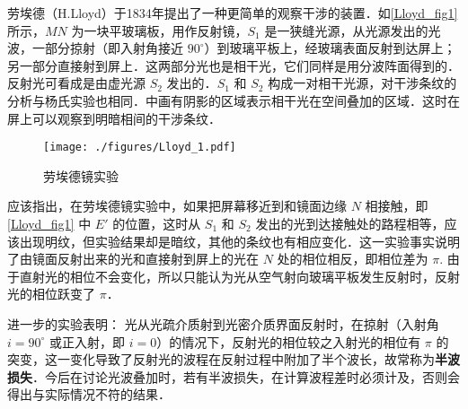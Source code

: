 

劳埃德（H.Lloyd）于1834年提出了一种更简单的观察干涉的装置．如\autoref{Lloyd_fig1} 所示，$MN $ 为一块平玻璃板，用作反射镜，$S_1$ 是一狭缝光源，从光源发出的光波，一部分掠射（即入射角接近 $90^\circ$）到玻璃平板上，经玻璃表面反射到达屏上；另一部分直接射到屏上．这两部分光也是相干光，它们同样是用分波阵面得到的．反射光可看成是由虚光源 $S_2 $ 发出的．$S_1$ 和 $S_2 $ 构成一对相干光源，对干涉条纹的分析与杨氏实验也相同．中画有阴影的区域表示相干光在空间叠加的区域．这时在屏上可以观察到明暗相间的干涉条纹．
\begin{figure}[ht]
\centering
\texttt{[image: ./figures/Lloyd\_1.pdf]}
\caption{劳埃德镜实验} \label{Lloyd_fig1}
\end{figure}
应该指出，在劳埃德镜实验中，如果把屏幕移近到和镜面边缘 $N $ 相接触，即\autoref{Lloyd_fig1} 中 $E' $ 的位置，这时从 $S_1$ 和 $S_2$ 发出的光到达接触处的路程相等，应该出现明纹，但实验结果却是暗纹，其他的条纹也有相应变化．这一实验事实说明了由镜面反射出来的光和直接射到屏上的光在 $N $ 处的相位相反，即相位差为 $\pi$. 由于直射光的相位不会变化，所以只能认为光从空气射向玻璃平板发生反射时，反射光的相位跃变了 $\pi$．

进一步的实验表明： 光从光疏介质射到光密介质界面反射时，在掠射（入射角 $i=90^\circ$ 或正入射，即 $i = 0$）的情况下，反射光的相位较之入射光的相位有 $\pi$ 的突变，这一变化导致了反射光的波程在反射过程中附加了半个波长，故常称为\textbf{半波损失}．今后在讨论光波叠加时，若有半波损失，在计算波程差时必须计及，否则会得出与实际情况不符的结果．
